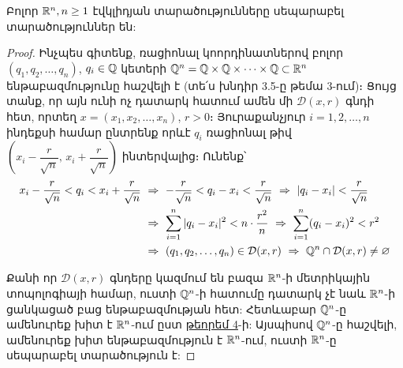 \documentclass[./main.tex]{subfiles}
\begin{document}
\begin{theorem}\label{ch8thm5}
\label{thm:8.5}
Բոլոր $\mathbb{R}^n, n \ge 1$ էվկլիդյան տարածությունները սեպարաբել տարա\-ծու\-թյուններ են:
\end{theorem}

\begin{proof}
\par Ինչպես գիտենք, ռացիոնալ կոորդինատներով բոլոր $(q_1, q_2, \dots, q_n)$, $q_i \in \mathbb{Q}$ կետերի $\mathbb{Q}^n = \mathbb{Q} \times \mathbb{Q} \times \dots \times \mathbb{Q} \subset \mathbb{R}^n$ ենթաբազմությունը հաշվելի է (տե՛ս խնդիր 3.5-ը թեմա 3-ում)։ Ցույց տանք, որ այն ունի ոչ դատարկ հատում ամեն մի $\mathcal{D}(x, r)$ գնդի հետ, որտեղ $x=(x_1, x_2, \dots, x_n)$, $r>0$։ Յուրաքանչյուր $i=1, 2, \dots, n$ ինդեքսի համար ընտրենք որևէ $q_i$ ռացիոնալ թիվ $(x_i - \dfrac{r}{\sqrt{n}},\, x_i + \dfrac{r}{\sqrt{n}})$ ինտերվալից։ Ունենք՝
\begin{align*}
    x_i - \frac{r}{\sqrt{n}} < q_i < x_i + \frac{r}{\sqrt{n}} \ &\Rightarrow \  
    -\frac{r}{\sqrt{n}} < q_i - x_i < \frac{r}{\sqrt{n}} \ \Rightarrow \  
    |q_i - x_i| < \frac{r}{\sqrt{n}} \\ &  \Rightarrow \ 
    \sum_{i=1}^n |q_i - x_i|^2 < n \cdot \frac{r^2}{n} \ \Rightarrow \  
    \sum_{i=1}^n (q_i - x_i)^2 < r^2 \\  & \Rightarrow \  
    (q_1, q_2, \dots, q_n) \in \mathcal{D}(x, r) \ \Rightarrow \  
    \Q^n \cap \mathcal{D}(x, r) \neq \varnothing
\end{align*}

\par Քանի որ $\mathcal{D}(x, r)$ գնդերը կազմում են բազա $\mathbb{R}^n$-ի մետրիկային տոպոլոգիայի համար, ուստի $\mathbb{Q}^n$-ի հատումը դատարկ չէ նաև $\mathbb{R}^n$-ի ցանկացած բաց ենթաբազ\-մու\-թյան հետ: Հետևաբար $\mathbb{Q}^n$-ը ամենուրեք խիտ է $\mathbb{R}^n$-ում ըստ \hyperref[ch8thm4]{թեորեմ 4}-ի: Այսպիսով $\mathbb{Q}^n$-ը հաշվելի, ամենուրեք խիտ ենթաբազմություն է $\mathbb{R}^n$-ում, ուստի $\mathbb{R}^n$-ը սեպարաբել տարածություն է:
\end{proof}
\end{document}
